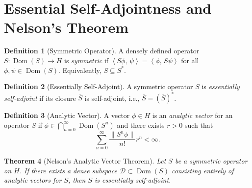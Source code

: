 \documentclass[11pt]{article}
\newtheorem{theorem}{Theorem}[section]
\theoremstyle{definition}
\newtheorem{definition}[theorem]{Definition}
\theoremstyle{remark}
\newcommand{\1}{\mathbbm{1}}
\newcommand{\ip}[2]{\left\langle #1,\,#2 \right\rangle}
\newcommand{\norm}[1]{\left\lVert #1 \right\rVert}
\DeclareMathOperator{\Dom}{Dom}
\begin{document}
\section{Essential Self-Adjointness and Nelson's Theorem}

\begin{definition}[Symmetric Operator]
A densely defined operator $S:\Dom(S)\to H$ is \emph{symmetric} if $\ip{S\phi}{\psi}=\ip{\phi}{S\psi}$ for all $\phi,\psi\in\Dom(S)$. Equivalently, $S\subseteq S^*$.
\end{definition}

\begin{definition}[Essentially Self-Adjoint]
A symmetric operator $S$ is \emph{essentially self-adjoint} if its closure $\overline{S}$ is self-adjoint, i.e., $\overline{S}=(\overline{S})^*$.
\end{definition}

\begin{definition}[Analytic Vector]
A vector $\phi\in H$ is an \emph{analytic vector} for an operator $S$ if $\phi\in\bigcap_{n=0}^\infty\Dom(S^n)$ and there exists $r>0$ such that
\[
\sum_{n=0}^\infty\frac{\norm{S^n\phi}}{n!}r^n<\infty.
\]
\end{definition}

\begin{theorem}[Nelson's Analytic Vector Theorem]\label{thm:nelson}
Let $S$ be a symmetric operator on $H$. If there exists a dense subspace $\mathcal{D}\subset\Dom(S)$ consisting entirely of analytic vectors for $S$, then $S$ is essentially self-adjoint.
\end{theorem}
\end{document}
